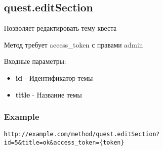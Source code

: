 \subsection{quest.editSection}

Позволяет редактировать тему квеста

Метод требует access\_token с правами admin

Входные параметры:
\begin{itemize}
  \item \textbf{id} - Идентификатор темы
  \item \textbf{title} - Название темы
\end{itemize}

\subsubsection{Example}
\begin{Verbatim}[frame=single]
http://example.com/method/quest.editSection?id=5&title=ok&access_token={token}
\end{Verbatim}